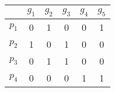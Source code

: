 \documentclass[tikz]{standalone}
\begin{document}
    \begin{table}
        \begin{tabular}{c|ccccc}
                  & $g_1$ & $g_2$ & $g_3$ & $g_4$ & $g_5$ \\
            \hline
            $p_1$ & 0 & 1 & 0 & 0 & 1 \\
            $p_2$ & 1 & 0 & 1 & 0 & 0 \\
            $p_3$ & 0 & 1 & 1 & 0 & 0 \\
            $p_4$ & 0 & 0 & 0 & 1 & 1 \\
        \end{tabular}
    \end{table}
\end{document}
